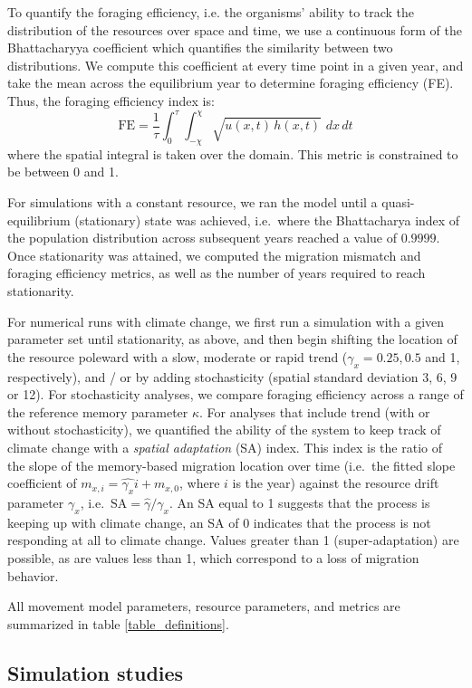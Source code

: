 \documentclass[utf8]{frontiersSCNS} %
\begin{document}
To quantify the foraging efficiency, i.e. the organisms' ability to track the distribution of the resources over space and time, we use a continuous form of the Bhattacharyya coefficient \citep{Bhattacharyya1943} which quantifies the similarity between two distributions. We compute this coefficient at every time point in a given year, and take the mean across the equilibrium year to determine foraging efficiency (FE). Thus, the foraging efficiency index is:
$$\text{FE} = \frac{1}{\tau} \int_{0}^\tau \int_{-\chi}^{\chi} \sqrt{u(x,t) \, h(x,t)} \,\, dx\,dt$$
\noindent where the spatial integral is taken over the domain. This metric is constrained to be between 0 and 1.

For simulations with a constant resource, we ran the model until a quasi-equilibrium (stationary) state was achieved, i.e.~where the Bhattacharya index of the population distribution across subsequent years reached a value of $0.9999$. Once stationarity was attained, we computed the migration mismatch and foraging efficiency metrics, as well as the number of years required to reach stationarity.

For numerical runs with climate change, we first run a simulation with a given parameter set until stationarity, as above, and then begin shifting the location of the resource poleward with a slow, moderate or rapid trend ($\gamma_x = 0.25, 0.5$ and 1, respectively), and / or by adding stochasticity (spatial standard deviation 3, 6, 9 or 12). For stochasticity analyses, we compare foraging efficiency across a range of the reference memory parameter $\kappa$.  For analyses that include trend (with or without stochasticity), we quantified the ability of the system to keep track of climate change with a \emph{spatial adaptation} (SA) index. This index is the ratio of the slope of the memory-based migration location over time (i.e.~the fitted slope coefficient of $m_{x,i} = \widehat{\gamma_x} i + m_{x,0}$, where $i$ is the year) against the resource drift parameter $\gamma_x$, i.e.~$\text{SA} = \widehat{\gamma}/\gamma_x$. An SA equal to 1 suggests that the process is keeping up with climate change, an SA of 0 indicates that the process is not responding at all to climate change.  Values greater than 1 (super-adaptation) are possible, as are values less than 1, which correspond to a loss of migration behavior.

All movement model parameters, resource parameters, and metrics are summarized in table \ref{table_definitions}. 

\subsection{Simulation studies}
\end{document}
